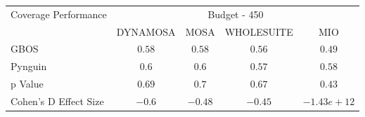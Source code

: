\begin{tabular}{lcccc}\toprule 
\multirow{2}{*}{Coverage Performance} & \multicolumn{4}{c}{Budget - 450} \\ \cmidrule(lr){2-5}  
                                      & DYNAMOSA&MOSA&WHOLESUITE&MIO                         \\ \midrule 
GBOS                                  & \(0.58\)&\(0.58\)&\(0.56\)&\(0.49\)                       \\ 
Pynguin                               & \(0.6\)&\(0.6\)&\(0.57\)&\(0.58\)                       \\ 
p Value                               & \(0.69\)&\(0.7\)&\(0.67\)&\(0.43\)                     \\ 
Cohen's D Effect Size                 & \(-0.6\)&\(-0.48\)&\(-0.45\)&\(-1.43e+12\)                       \\ 
\bottomrule 
\end{tabular}